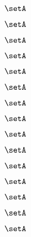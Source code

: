 \begin{forslides}
    \begin{equation}
        \label{eq:feedback-175}
        \setA
    \end{equation}

    \begin{equation}
        \label{eq:feedback-176}
        \setA
    \end{equation}

    \begin{equation}
        \label{eq:feedback-177}
        \setA
    \end{equation}

    \begin{equation}
        \label{eq:feedback-178}
        \setA
    \end{equation}

    \begin{equation}
        \label{eq:feedback-179}
        \setA
    \end{equation}

    \begin{equation}
        \label{eq:feedback-180}
        \setA
    \end{equation}

    \begin{equation}
        \label{eq:feedback-181}
        \setA
    \end{equation}

    \begin{equation}
        \label{eq:feedback-182}
        \setA
    \end{equation}

    \begin{equation}
        \label{eq:feedback-183}
        \setA
    \end{equation}

    \begin{equation}
        \label{eq:feedback-184}
        \setA
    \end{equation}

    \begin{equation}
        \label{eq:feedback-185}
        \setA
    \end{equation}

    \begin{equation}
        \label{eq:feedback-186}
        \setA
    \end{equation}

    \begin{equation}
        \label{eq:feedback-187}
        \setA
    \end{equation}

    \begin{equation}
        \label{eq:feedback-188}
        \setA
    \end{equation}

    \begin{equation}
        \label{eq:feedback-189}
        \setA
    \end{equation}

\end{forslides}